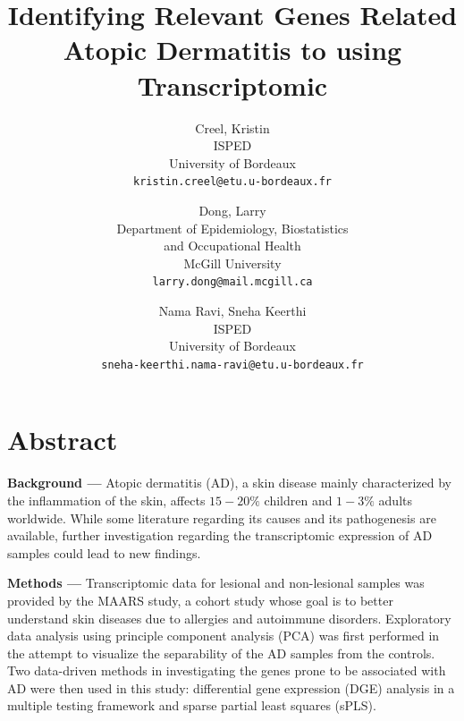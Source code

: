 \documentclass[journal, a4paper]{IEEEtran}
\begin{document}
\title{\Large{Identifying Relevant Genes Related Atopic Dermatitis  to  using Transcriptomic}}
\author{%
\begin{tabular}{c} Creel, Kristin \\ ISPED \\ University of Bordeaux \\ \texttt{kristin.creel@etu.u-bordeaux.fr} \end{tabular} \and
\begin{tabular}{c} Dong, Larry \\ Department of Epidemiology, Biostatistics \\ and Occupational Health \\ McGill University \\ \texttt{larry.dong@mail.mcgill.ca} \end{tabular} \and
\begin{tabular}{c} Nama Ravi, Sneha Keerthi \\ ISPED \\ University of Bordeaux \\ \texttt{sneha-keerthi.nama-ravi@etu.u-bordeaux.fr} \end{tabular}}
\maketitle





\section*{\textbf{Abstract}}

\textbf{Background --- } Atopic dermatitis (AD), a skin disease mainly characterized by the inflammation of the skin, affects $15-20 \%$ children and $1-3\%$ adults worldwide. While some literature regarding its causes and its pathogenesis are available, further investigation regarding the transcriptomic expression of AD samples could lead to new findings.%

\textbf{Methods ---} Transcriptomic data for lesional and non-lesional samples was provided by the MAARS study, a cohort study whose goal is to better understand skin diseases due to allergies and autoimmune disorders. Exploratory data analysis using principle component analysis (PCA) was first performed in the attempt to visualize the separability of the AD samples from the controls. Two data-driven methods in investigating the genes prone to be associated with AD were then used in this study: differential gene expression (DGE) analysis in a multiple testing framework and sparse partial least squares (sPLS).
\end{document}
